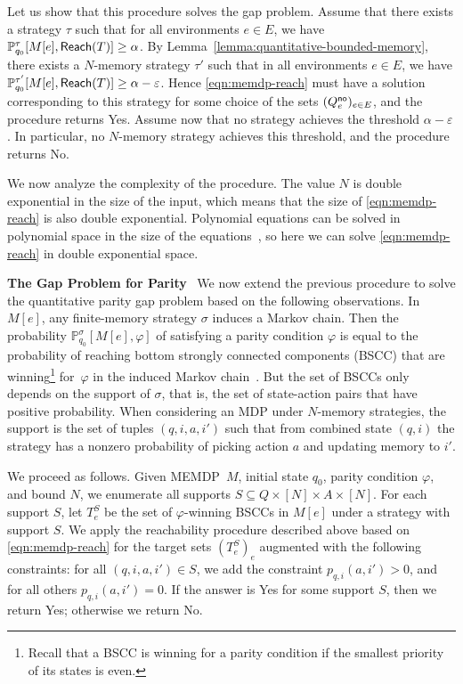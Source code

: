 \documentclass[a4paper,USenglish,cleveref, autoref, thm-restate]{lipics-v2021}
\let\epsilon\varepsilon
\def\myparagraph#1{\noindent\textbf{#1}~}
\newcommand*{\pr}{\mathbb{P}}
\newcommand\Reach{\textrm{\sf Reach}}
\begin{document}
Let us show that this procedure solves the gap problem.
Assume that there exists a strategy $\tau$ such that for all environments $e \in E$, 
we have $\pr_{q_0}^{\tau}[M[e],\Reach(T)]\geq \alpha$.
By Lemma~\ref{lemma:quantitative-bounded-memory}, there exists a $N$-memory strategy $\tau'$ 
such that in all environments $e \in E$, we have $\pr_{q_0}^{\tau'}[M[e],\Reach(T)]\geq \alpha-\epsilon$.
Hence \eqref{eqn:memdp-reach} must have a solution corresponding to this strategy for some choice of the sets $(Q^{\textsf{no}}_e)_{e\in E}$, and
the procedure returns \textsf{Yes}.
Assume now that no strategy achieves the threshold $\alpha-\epsilon$. In particular, no $N$-memory strategy
achieves this threshold, and the procedure returns \textsf{No}.

We now analyze the complexity of the procedure.
The value $N$ is double exponential in the size of the input, which means that the size of \eqref{eqn:memdp-reach} is also double exponential.
Polynomial equations can be solved in polynomial space in the size of the equations~\cite{Canny-stoc1988},
so here we can solve \eqref{eqn:memdp-reach} in double exponential space.

\smallskip
\myparagraph{The Gap Problem for Parity}
We now extend the previous procedure to solve the quantitative parity gap problem based on the following observations.
In $M[e]$, any finite-memory strategy $\sigma$ induces a Markov chain. Then the probability $\pr_{q_0}^\sigma[M[e], \varphi]$
of satisfying a parity condition $\varphi$ is equal to the probability of reaching bottom strongly connected components (BSCC) 
that are winning\footnote{Recall that a BSCC is winning for a parity condition if the smallest priority of its states is even.} 
for~$\varphi$ in the induced Markov chain~\cite{BK08}. 
But the set of BSCCs only depends on the support of $\sigma$, that is, the set of state-action pairs that have positive probability.
When considering an MDP under $N$-memory strategies, the support is the set of tuples $(q,i,a,i')$ such that
from combined state $(q,i)$ the strategy has a nonzero probability of picking action $a$ and updating memory to $i'$.

We proceed as follows. Given MEMDP~$M$, initial state $q_0$, parity condition $\varphi$, and bound $N$, we enumerate 
all supports $S \subseteq Q \times [N] \times A \times [N]$. 
For each support $S$, let $T^S_e$ be the set of $\varphi$-winning BSCCs in $M[e]$ under a strategy with support $S$.
We apply the reachability procedure described above based on \eqref{eqn:memdp-reach} for the target sets $(T^S_e)_e$ 
augmented with the following constraints:
for all $(q,i,a,i') \in S$, we add the constraint $p_{q,i}(a,i')>0$, and for all others $p_{q,i}(a,i')=0$.
If the answer is \textsf{Yes} for some support $S$, then we return \textsf{Yes}; otherwise we return \textsf{No}.
\end{document}
